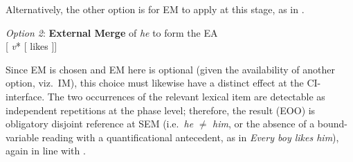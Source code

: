\documentclass[output=paper]{langsci/langscibook}
\begin{document}
Alternatively, the other option is for \gls{EM} to apply at this stage, as in
.

\ea\label{ex:key:22.11}\emph{Option 2}: \textbf{External Merge} of \emph{he} to
    form the \gls{EA}\\
    {}[\emph{}   \emph{v}* [ likes  ]]
    \vspace{1.5\baselineskip}
\z

Since \gls{EM} is chosen and \gls{EM} here is optional (given the availability
of another option, viz.\ \gls{IM}), this choice must likewise have a distinct
effect at the CI-interface. The two occurrences of the relevant lexical item
are detectable as independent repetitions at the phase level; therefore, the
result (\gls{EOO}) is obligatory disjoint reference at SEM (i.e.\ \emph{he} ${\neq}$
\emph{him}, or the absence of a bound-variable reading with a quantificational
antecedent, as in \emph{Every boy likes him}), again in line with
.
\end{document}
